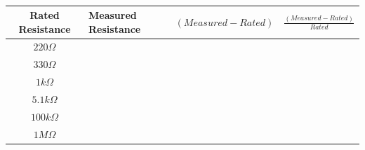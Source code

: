 \documentclass[12pt]{article}
\begin{document}
\begin{table}[H]
    \centering
    \begin{tabular}{|c||l|l|l|}
        \hline
        Rated Resistance & Measured Resistance & $(Measured - Rated)$ & $\frac{(Measured - Rated)}{Rated}$  \\ \hline \hline
        $220\Omega$      &                     &                      &                                     \\ \hline
        $330\Omega$      &                     &                      &                                     \\ \hline
        $1k\Omega$       &                     &                      &                                     \\ \hline
        $5.1k\Omega$     &                     &                      &                                     \\ \hline
        $100k\Omega$     &                     &                      &                                     \\ \hline
        $1M\Omega$       &                     &                      &                                     \\ \hline
    \end{tabular}
    \caption{}
\end{table}
\end{document}
